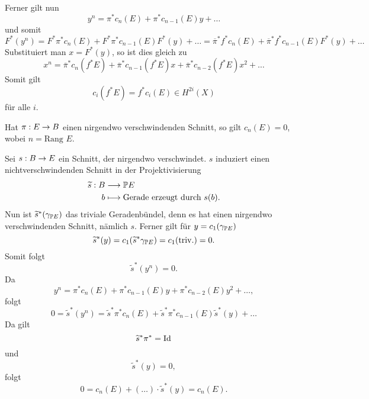 Ferner gilt nun
\[ y^n = \pi^* c_n(E) + \pi^*c_{n-1}(E) y + \ldots \]
und somit
\[ F^*(y^n) = F^*\pi^*c_n(E) + F^*\pi^*c_{n-1}(E)F^*(y) + \ldots
= \overline{\pi}^* f^*c_n(E) + \overline{\pi}^* f^*c_{n-1}(E) F^*(y) + \ldots \]
Substituiert man $x = F^*(y)$, so ist dies gleich zu
\[ x^n = \overline{\pi}^*c_n(f^* E) + 
\overline{\pi}^*c_{n-1}(f^* E) x +
\overline{\pi}^*c_{n-2}(f^* E) x^2 +\ldots 
 \]
Somit gilt
\[ c_i(f^* E) = f^*c_i(E) \in H^{2i}(X) \]
für alle $i$.

\Prop{}
Hat $\pi : E \pfeil{} B$ einen nirgendwo verschwindenden Schnitt, so gilt $c_n(E) = 0$, wobei $n = \text{Rang }E$.
\begin{Beweis}{}
Sei $s : B \pfeil{} E$ ein Schnitt, der nirgendwo verschwindet. $s$ induziert einen nichtverschwindenden Schnitt in der Projektivisierung
\begin{align*}
\widetilde{s} : B & \Pfeil{} \P E\\
b & \longmapsto \text{Gerade erzeugt durch }s(b).
\end{align*}
Nun ist $\widetilde{s}^*(\gamma_{\P E})$ das triviale Geradenbündel, denn es hat einen nirgendwo verschwindenden Schnitt, nämlich $s$. Ferner gilt für $y = c_1(\gamma_{\P E})$
\[ \widetilde{s}^*(y) = c_1(\widetilde{s}^*\gamma_{\P E}) = c_1(\mathrm{triv.}) = 0. \]
Somit folgt
\[ \widetilde{s}^*(y^n) = 0. \]
Da
\[ y^n = \pi^* c_n(E) +
\pi^*c_{n-1}(E) y
+\pi^* c_{n-2}(E) y^2 + \ldots,
 \]
folgt
\[ 0 = \widetilde{s}^*(y^n)
= \widetilde{s}^*\pi^*c_n(E)
+ \widetilde{s}^*\pi^*c_{n-1}(E)\widetilde{s}^*(y) + \ldots
 \]
 Da gilt
 \[ \widetilde{s}^* \pi^* = \id{} \]
 und
 \[ \widetilde{s}^*(y) = 0, \]
 folgt
 \[ 0 = c_n(E) + ( \ldots) \cdot \widetilde{s}^*(y) = c_n(E). \]
\end{Beweis}


